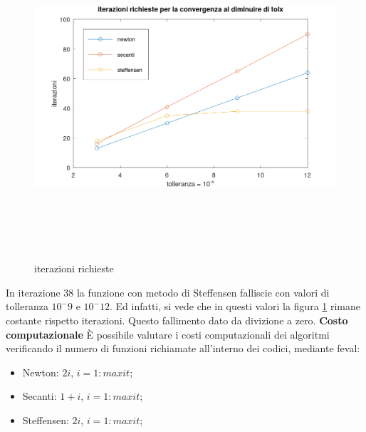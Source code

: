 \begin{figure}[h!]
        \includegraphics[width=16cm,height=12cm,keepaspectratio]{capitolo2/es7_figure.png}
        \caption{iterazioni richieste}
        \label{fig:es7}
\end{figure}
\newline
In iterazione 38 la funzione con metodo di Steffensen falliscie con valori di tolleranza
$10^-9$ e $10^-12$. Ed infatti, si vede che in questi valori la figura \ref{fig:es7}
rimane costante rispetto iterazioni. Questo fallimento dato da divizione a zero.
\newline \textbf{Costo computazionale} \newline
È possibile valutare i costi computazionali dei algoritmi verificando il numero
di funzioni richiamate all'interno dei codici, mediante feval:
\begin{itemize}
        \item Newton: $2i$, $i=1:maxit$;
        \item Secanti: $1 + i$, $i=1:maxit$;
        \item Steffensen: $2i$, $i=1:maxit$;
\end{itemize}
